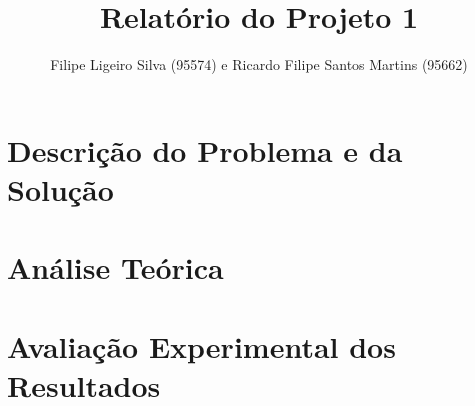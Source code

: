\documentclass[a4paper, 12pt]{article}
\author{Filipe Ligeiro Silva (95574) e Ricardo Filipe Santos Martins (95662)}
\title{Relatório do Projeto 1}
\date{}
\begin{document}
\section*{Descrição do Problema e da Solução}
\section*{Análise Teórica}
\section*{Avaliação Experimental dos Resultados}
\end{document}
